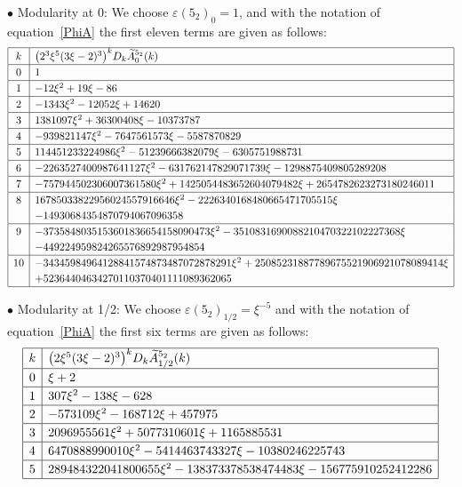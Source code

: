 \documentclass[pdftex]{sigma}
\numberwithin{equation}{section}
\def\wt{\widetilde}
\def\ve{\varepsilon}
\def\tiA{\wt A}
\begin{document}
$\bullet$ Modularity at 0:
We choose $\ve(5_2)_0=1$, and with the notation of equation~\eqref{PhiA}
the first eleven terms are given as follows:
$$
 \def\arraystretch{1.2}
\begin{array}{|c|l|} \hline
k & \big(2^3 \xi^5 (3\xi-2)^3\big)^k  D_k  \tiA^{5_2}_{0}(k) \\ \hline
0 & 1
\\ \hline
1 & -12 \xi^2 + 19 \xi - 86
\\ \hline
2 & -1343 \xi^2 - 12052 \xi + 14620
\\ \hline
3 & 1381097 \xi^2 + 36300408 \xi - 10373787
\\ \hline
4 & -939821147 \xi^2 - 7647561573 \xi - 5587870829
\\ \hline
5 & 114451233224986 \xi^2 - 51239666382079 \xi - 6305751988731
\\ \hline
6 & -2263527400987641127 \xi^2 - 631762147829071739 \xi - 1298875409805289208
\\ \hline
7 & -757944502306007361580 \xi^2 + 1425054483652604079482 \xi + 2654782623273180246011
\\ \hline
8 & 16785033822956024557916646 \xi^2 - 2226340168480665471705515 \xi
\\ &
- 14930684354870794067096358
\\ \hline
9 & -3735848035153601836654158090473 \xi^2 - 3510831690088210470322102227368 \xi
\\ &
- 449224959824265576892987954854
\\ \hline
10 & -34345984964128841574873487072878291 \xi^2 + 25085231887789675521906921078089414 \xi
\\ &
+ 52364404634270110370401111089362065
\\ \hline
\end{array}
$$

$\bullet$ Modularity at 1/2:
We choose $\ve(5_2)_{1/2} =\xi^{-5}$ and with the notation of
equation~\eqref{PhiA} the first six
terms are given as follows:
$$
\def\arraystretch{1.2}
\begin{array}{|c|l|} \hline
k & \big(2  \xi^5 (3\xi-2)^3\big)^k  D_k  \tiA^{5_2}_{1/2}(k) \\ \hline
0 & \xi + 2
\\ \hline
1 & 307 \xi^2 - 138 \xi - 628
\\ \hline
2 & -573109 \xi^2 - 168712 \xi + 457975
\\ \hline
3 & 2096955561 \xi^2 + 5077310601 \xi + 1165885531
\\ \hline
4 & 6470888990010 \xi^2 - 5414463743327 \xi - 10380246225743
\\ \hline
5 & 289484322041800655 \xi^2 - 138373378538474483 \xi - 156775910252412286
\\ \hline
\end{array}
$$
\end{document}
